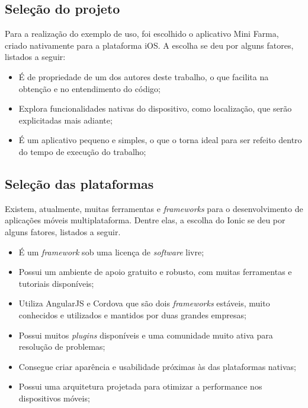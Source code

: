 \subsection{Seleção do projeto} \label{subsection:selecaodoprojeto}

Para a realização do exemplo de uso, foi escolhido o aplicativo Mini Farma, criado nativamente para a plataforma iOS. A escolha se deu por alguns fatores, listados a seguir:

\begin{itemize}
    \item É de propriedade de um dos autores deste trabalho, o que facilita na obtenção e no entendimento do código;
    \item Explora funcionalidades nativas do dispositivo, como localização, que serão explicitadas mais adiante;
    \item É um aplicativo pequeno e simples, o que o torna ideal para ser refeito dentro do tempo de execução do trabalho;
\end{itemize}

\subsection{Seleção das plataformas} \label{subsection:selecaodasplataformas}

Existem, atualmente, muitas ferramentas e \textit{frameworks} para o desenvolvimento de aplicações móveis multiplataforma. Dentre elas, a escolha do Ionic se deu por alguns fatores, listados a seguir. 

\begin{itemize}
    \item É um \textit{framework} sob uma licença de \textit{software} livre;
    \item Possui um ambiente de apoio gratuito e robusto, com muitas ferramentas e tutoriais disponíveis;
    \item Utiliza AngularJS e Cordova que são dois \textit{frameworks} estáveis, muito conhecidos e utilizados e mantidos por duas grandes empresas;
    \item Possui muitos \textit{plugins} disponíveis e uma comunidade muito ativa para resolução de problemas; %
    \item Consegue criar aparência e usabilidade próximas às das plataformas nativas; %
    \item Possui uma arquitetura projetada para otimizar a performance nos dispositivos móveis; 
\end{itemize}
 
